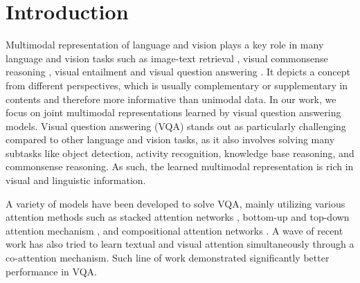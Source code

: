 \documentclass{article}
\begin{document}
\section{Introduction}
Multimodal representation of language and vision plays a key role in many language and vision tasks such as image-text retrieval \citep{wang2016retrieval}, visual commonsense reasoning \citep{zellers2019vcr}, visual entailment \citep{xie2019entailment} and visual question answering \citep{antol2015vqa}. It depicts a concept from different perspectives, which is usually complementary or supplementary in contents and therefore more informative than unimodal data. In our work, we focus on joint multimodal representations learned by visual question answering models. Visual question answering (VQA) stands out as particularly challenging compared to other language and vision tasks, as it also involves solving many subtasks like object detection, activity recognition, knowledge base reasoning, and commonsense reasoning. As such, the learned multimodal representation is rich in visual and linguistic information. 



A variety of models have been developed to solve VQA, mainly utilizing various attention methods such as stacked attention networks \citep{yang2016vqa}, bottom-up and top-down attention mechanism \citep{Anderson_2018_CVPR}, and compositional attention networks \citep{hudson2018mac}. A wave of recent work has also tried to learn textual and visual attention simultaneously through a co-attention mechanism. Such line of work \citep{yu2019mcan, Nguyen_2018_CVPR} demonstrated significantly better performance in VQA. 
\end{document}
